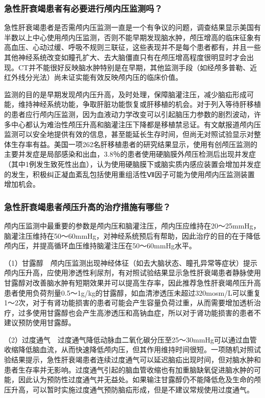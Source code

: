 \subsubsection{急性肝衰竭患者有必要进行颅内压监测吗？}

急性肝衰竭患者是否需颅内压监测一直是一个有争议的问题，调查结果显示美国有半数以上中心使用颅内压监测，否则不能早期发现脑水肿，颅压增高的临床征象有高血压、心动过缓、呼吸不规则三联征，这些表现并不是每个患者都有，并且一些其他神经系统改变如瞳孔扩大、去大脑僵直只有在颅压增高程度很明显时才会出现。CT并不能很好反映脑水肿特别是在早期，其他监测手段（如经颅多普勒、近红外线分光法）尚未证实能有效反映颅内压的临床价值。

监测的目的是早期发现颅内压升高，及时处理，保障脑灌注压，减少脑疝形成可能，维持神经系统功能，争取肝脏功能恢复或肝移植的机会。对于列入等待肝移植的患者应行颅内压监测，因为血液动力学改变可以引起脑压力参数的剧烈波动，许多中心都认为难治性颅压升高和脑灌注压下降都是移植禁忌证。有文献报道颅内压监测可以安全地提供有效的信息，甚至能延长生存时间，但尚无对照试验显示对整体生存率有益。美国一项262名肝移植患者的研究结果显示，使用有创颅压监测的主要并发症是局部感染和出血，3.8％的患者使用硬脑膜外颅压检测后出现并发症（其中1例发生致死性出血），认为使用硬脑膜下或脑实质内感应装置会增加并发症的发生，积极纠正凝血紊乱包括使用重组活性Ⅶ因子可能为使用颅内压监测装置增加机会。

\subsubsection{急性肝衰竭患者颅压升高的治疗措施有哪些？}

颅内压监测中最重要的参数是颅内压和脑灌注压，颅内压应维持在20～25mmHg，脑灌注压维持在50～60mmHg，对神经系统预后有帮助，因此治疗的目的在于降低颅内压，并提高循环血压维持脑灌注压在50～60mmHg水平。

（1）甘露醇　颅内压监测出现神经体征（如去大脑状态、瞳孔异常等症状）提示颅内压升高，应使用渗透性利尿剂，有对照试验结果显示急性肝衰竭患者静脉使用甘露醇对改善脑水肿有短期效果并可以提高生存率，因此推荐急性肝衰竭颅压升高患者使用负荷剂量0.5～1g/kg的甘露醇，如血清渗透压未超过320mosm/L可以重复1～2次，对于有肾功能损害的患者可能会产生容量负荷过重，从而需要增加透析治疗，过多使用甘露醇也会产生高渗透压和高钠血症，所以对于肾功能损害的患者不建议预防使用甘露醇。

（2）过度通气　过度通气降低动脉血二氧化碳分压至25～30mmHg可以通过血管收缩降低脑血流，从而快速降低颅内压，但其作用维持时间很短。一项随机对照试验结果提示，急性肝衰竭患者连续过度通气可以延迟脑疝出现时间，但对脑水肿和患者生存率并无影响。过度通气引起的脑血管收缩也有加重脑缺氧促进脑水肿的可能，因此认为预防性过度通气并无益处。如果输注甘露醇仍不能降低危及生命的颅压升高，可以暂时实施过度通气预防脑疝形成，但是不建议常规使用过度通气。

